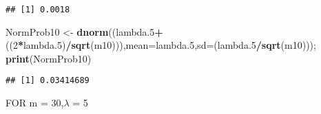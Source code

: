 \documentclass[
]{article}
\newenvironment{Shaded}{\begin{snugshade}}{\end{snugshade}}
\newcommand{\DataTypeTok}[1]{\textcolor[rgb]{0.13,0.29,0.53}{#1}}
\newcommand{\DecValTok}[1]{\textcolor[rgb]{0.00,0.00,0.81}{#1}}
\newcommand{\FloatTok}[1]{\textcolor[rgb]{0.00,0.00,0.81}{#1}}
\newcommand{\KeywordTok}[1]{\textcolor[rgb]{0.13,0.29,0.53}{\textbf{#1}}}
\newcommand{\NormalTok}[1]{#1}
\newcommand{\OperatorTok}[1]{\textcolor[rgb]{0.81,0.36,0.00}{\textbf{#1}}}
\newcommand{\StringTok}[1]{\textcolor[rgb]{0.31,0.60,0.02}{#1}}
\begin{document}
\begin{verbatim}
## [1] 0.0018
\end{verbatim}

\begin{Shaded}
\begin{Highlighting}[]
\NormalTok{NormProb10 <-}\StringTok{ }\KeywordTok{dnorm}\NormalTok{((lambda}\FloatTok{.5}\OperatorTok{+}\NormalTok{((}\DecValTok{2}\OperatorTok{*}\NormalTok{lambda}\FloatTok{.5}\NormalTok{)}\OperatorTok{/}\KeywordTok{sqrt}\NormalTok{(m10))),}\DataTypeTok{mean=}\NormalTok{lambda}\FloatTok{.5}\NormalTok{,}\DataTypeTok{sd=}\NormalTok{(lambda}\FloatTok{.5}\OperatorTok{/}\KeywordTok{sqrt}\NormalTok{(m10))); }\KeywordTok{print}\NormalTok{(NormProb10)}
\end{Highlighting}
\end{Shaded}

\begin{verbatim}
## [1] 0.03414689
\end{verbatim}

FOR m = 30,\(\lambda\) = 5
\end{document}
